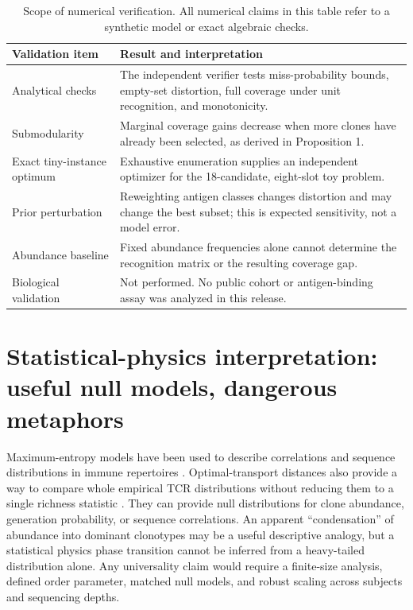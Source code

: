 \documentclass[11pt]{article}
\begin{document}
\begin{table}[ht]
\centering\small
\begin{tabularx}{\linewidth}{lX}
\toprule
Validation item & Result and interpretation\\
\midrule
Analytical checks & The independent verifier tests miss-probability bounds, empty-set distortion, full coverage under unit recognition, and monotonicity.\\
Submodularity & Marginal coverage gains decrease when more clones have already been selected, as derived in Proposition 1.\\
Exact tiny-instance optimum & Exhaustive enumeration supplies an independent optimizer for the 18-candidate, eight-slot toy problem.\\
Prior perturbation & Reweighting antigen classes changes distortion and may change the best subset; this is expected sensitivity, not a model error.\\
Abundance baseline & Fixed abundance frequencies alone cannot determine the recognition matrix or the resulting coverage gap.\\
Biological validation & Not performed. No public cohort or antigen-binding assay was analyzed in this release.\\
\bottomrule
\end{tabularx}
\caption{Scope of numerical verification. All numerical claims in this table refer to a synthetic model or exact algebraic checks.}
\end{table}

\section{Statistical-physics interpretation: useful null models, dangerous metaphors}
Maximum-entropy models have been used to describe correlations and sequence distributions in immune repertoires \citep{Mora2010,Elhanati2014}. Optimal-transport distances also provide a way to compare whole empirical TCR distributions without reducing them to a single richness statistic \citep{Olson2022}. They can provide null distributions for clone abundance, generation probability, or sequence correlations. An apparent ``condensation'' of abundance into dominant clonotypes may be a useful descriptive analogy, but a statistical physics phase transition cannot be inferred from a heavy-tailed distribution alone. Any universality claim would require a finite-size analysis, defined order parameter, matched null models, and robust scaling across subjects and sequencing depths.
\end{document}
